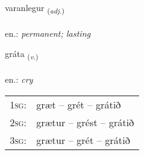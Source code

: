 \documentclass[frontgrid, backgrid]{flacards}\usepackage[]{graphicx}\usepackage[]{xcolor}
\begin{document}
\renewcommand{\flhead}{\vskip5pt \fboxsep=0pt {\small\bfseries\footnotesize Lýsingarorð | Adjective}}
\renewcommand{\fcfoot}{\vskip5pt \fboxsep=0pt \hspace{2pt}{\small\bfseries\footnotesize 2K}}

\renewcommand{\blhead}{\vskip5pt {\small\bfseries\footnotesize Lýsingarorð | Adjective }}
\renewcommand{\bcfoot}{\vskip5pt \hspace{2pt}{\small\bfseries\footnotesize 2K}}


{varanlegur \small{\textsubscript{(\textit{adj.})}} \\[1ex] %
\textphonetic{[vaːranlɛɣʏr]} \\
en.: \emph{permanent; lasting} \\  [2ex]
\renewcommand*{\arraystretch}{0.8}
}

\renewcommand{\flhead}{\vskip5pt \fboxsep=0pt {\small\bfseries\footnotesize Sagnorð | Verb}}
\renewcommand{\fcfoot}{\vskip5pt \fboxsep=0pt \hspace{2pt}{\small\bfseries\footnotesize 2K}}

\renewcommand{\blhead}{\vskip5pt {\small\bfseries\footnotesize Sagnorð | Verb }}
\renewcommand{\bcfoot}{\vskip5pt \hspace{2pt}{\small\bfseries\footnotesize 2K}}


{gráta \small{\textsubscript{(\textit{v.})}} \\[1ex] %
\textphonetic{[krauːta]} \\
en.: \emph{cry} \\  [2ex]
\renewcommand*{\arraystretch}{0.8}
\begin{tabular}{p{1cm}l}
\textsc{1sg}: & græt -- grét -- grátið \\ 
\textsc{2sg}: & grætur -- grést -- grátið \\ 
\textsc{3sg}: & grætur -- grét -- grátið \\ 
\end{tabular}
}
\end{document}
